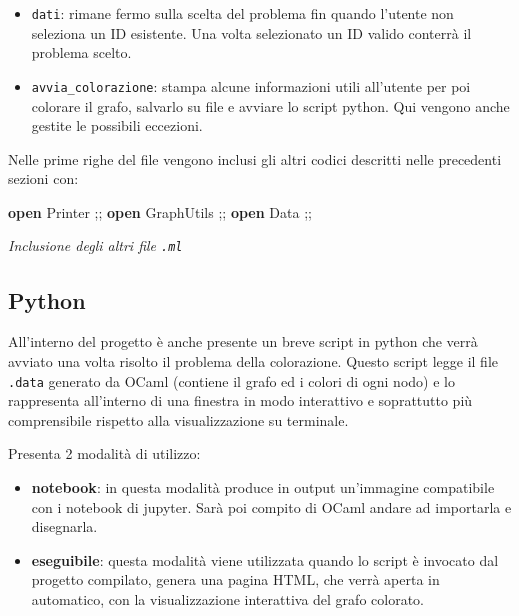 \documentclass[11pt]{article}
\providecommand{\tightlist}{%
      \setlength{\itemsep}{0pt}\setlength{\parskip}{0pt}}
\newenvironment{Shaded}{}{}
\newcommand{\KeywordTok}[1]{\textcolor[rgb]{0.00,0.44,0.13}{\textbf{{#1}}}}
\newcommand{\NormalTok}[1]{{#1}}
\begin{document}
\begin{itemize}
\tightlist
\item
  \texttt{dati}: rimane fermo sulla scelta del problema fin quando
  l'utente non seleziona un ID esistente. Una volta selezionato un ID
  valido conterrà il problema scelto.
\item
  \texttt{avvia\_colorazione}: stampa alcune informazioni utili
  all'utente per poi colorare il grafo, salvarlo su file e avviare lo
  script python. Qui vengono anche gestite le possibili eccezioni.
\end{itemize}

    Nelle prime righe del file vengono inclusi gli altri codici descritti
nelle precedenti sezioni con:

\begin{Shaded}
\begin{Highlighting}[]
\KeywordTok{open}\NormalTok{ Printer ;;}
\KeywordTok{open}\NormalTok{ GraphUtils ;;}
\KeywordTok{open}\NormalTok{ Data ;;}
\end{Highlighting}
\end{Shaded}

\emph{Inclusione degli altri file \texttt{.ml}}

    \hypertarget{python}{%
\subsection{\texorpdfstring{Python }{Python }}\label{python}}

    All'interno del progetto è anche presente un breve script in python che
verrà avviato una volta risolto il problema della colorazione. Questo
script legge il file \texttt{.data} generato da OCaml (contiene il grafo
ed i colori di ogni nodo) e lo rappresenta all'interno di una finestra
in modo interattivo e soprattutto più comprensibile rispetto alla
visualizzazione su terminale.

Presenta 2 modalità di utilizzo:

\begin{itemize}
\tightlist
\item
  \textbf{notebook}: in questa modalità produce in output un'immagine
  compatibile con i notebook di jupyter. Sarà poi compito di OCaml
  andare ad importarla e disegnarla.
\item
  \textbf{eseguibile}: questa modalità viene utilizzata quando lo script
  è invocato dal progetto compilato, genera una pagina HTML, che verrà
  aperta in automatico, con la visualizzazione interattiva del grafo
  colorato.
\end{itemize}
\end{document}
